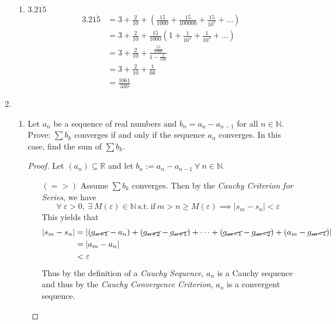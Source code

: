 \documentclass[12pt,letterpaper]{article}
\newcommand{\st}{\ \text{s.t.}\ }
\newcommand{\R}{\mathbb{R}}
\newcommand{\N}{\mathbb{N}}
\theoremstyle{case}
\theoremstyle{definition}
\begin{document}
\begin{enumerate}
\begin{enumerate}
			\item $3.2\overline{15}$
			\begin{align*}
				3.2\overline{15} &= 3+ \frac{2}{10} + \left(\frac{15}{1000}+\frac{15}{100000}+\frac{15}{10^7}+\dots\right) \\
				&= 3+\frac{2}{10}+\frac{15}{1000}\left(1+\frac{1}{10^2}+\frac{1}{10^3}+\dots\right)\\
				&= 3+\frac{2}{10} + \frac{\frac{15}{1000}}{1-\frac{1}{100}} \\
				&= 3+\frac{2}{10} + \frac{1}{66} \\
				&= \frac{1061}{330}
			\end{align*}
		\end{enumerate}
		\item 
		\begin{enumerate}
			\item Let $a_n$ be a sequence of real numbers and $b_n=a_n-a_{n-1}$ for all $n \in \N$. Prove: $\sum b_k$ converges if and only if the sequence $a_n$ converges. In this case, find the sum of $\sum b_k$.
			\begin{proof}
				Let $(a_n)\subseteq \R$ and let $b_n:=a_n-a_{n-1}\ \forall\ n \in \N$.
				\begin{itemize}
					\item[$(=>)$] Assume $\sum b_k$ converges. Then by the \textit{Cauchy Criterion for Series}, we have
					\[\forall\ \varepsilon>0,\ \exists\ M(\varepsilon)\in \N \st \text{if}\ m>n\geq M(\varepsilon) \implies |s_m-s_n|<\varepsilon\]
					This yields that
					\begin{align*}
						|s_m-s_n|&= |(\cancel{a_{n+1}}-a_n)+(\cancel{a_{n+2}}-\cancel{a_{n+1}})+\dots+(\cancel{a_{m-1}}-\cancel{a_{m-2}})+(a_m-\cancel{a_{m-1}})| \\
						&= |a_m-a_n| \\
						&<\varepsilon
					\end{align*}
					Thus by the definition of a \textit{Cauchy Sequence}, $a_n$ is a Cauchy sequence and thus by the \textit{Cauchy Convergence Criterion}, $a_n$ is a convergent sequence.
					

\end{itemize}
\end{proof}
\end{enumerate}
\end{enumerate}
\end{document}
